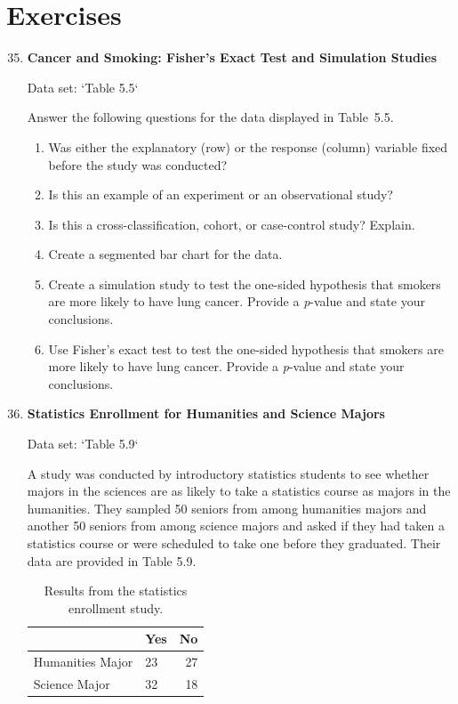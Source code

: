 \documentclass[
]{book}
\begin{document}
\hypertarget{exercises-4}{%
\section{Exercises}\label{exercises-4}}

\begin{enumerate}
  \setcounter{enumi}{34}

  \item \textbf{Cancer and Smoking: Fisher’s Exact Test and Simulation Studies}    

  Data set: `Table 5.5`    

  Answer the following questions for the data displayed in Table 5.5.  
  \begin{enumerate}
    \item Was either the explanatory (row) or the response (column) variable fixed before the study was conducted?
    \item Is this an example of an experiment or an observational study?
    \item Is this a cross-classification, cohort, or case-control study? Explain.
    \item Create a segmented bar chart for the data.
    \item Create a simulation study to test the one-sided hypothesis that smokers are more likely to have lung cancer. Provide a \textit{p}-value and state your conclusions.
    \item Use Fisher’s exact test to test the one-sided hypothesis that smokers are more likely to have lung cancer. Provide a \textit{p}-value and state your conclusions.
  \end{enumerate}

  \item \textbf{Statistics Enrollment for Humanities and Science Majors}    

  Data set: `Table 5.9`    

  A study was conducted by introductory statistics students to see whether majors in the sciences are as likely to take a statistics course as majors in the humanities. They sampled 50 seniors from among humanities majors and another 50 seniors from among science majors and asked if they had taken a statistics course or were scheduled to take one before they graduated. Their data are provided in Table 5.9.  
  
\begin{table}[!h]
\centering
\caption{\label{tab:tab9}Results from the statistics enrollment study.}
\centering
\begin{tabular}[t]{llr}
\toprule
  & Yes & No\\
\midrule
Humanities Major & 23 & 27\\
Science Major & 32 & 18\\
\bottomrule
\end{tabular}
\end{table}


\end{enumerate}
\end{document}
